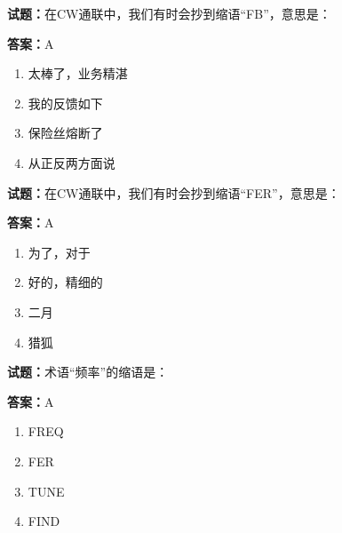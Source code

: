 \documentclass{ctexbook}
\begin{document}




\vspace{1em}

\textbf{试题：}在CW通联中，我们有时会抄到缩语“FB”，意思是： 

\textbf{答案：}A 

\begin{enumerate}[leftmargin=3em]
  \item 太棒了，业务精湛 

  \item 我的反馈如下 

  \item 保险丝熔断了 

  \item 从正反两方面说 

\end{enumerate}





\vspace{1em}

\textbf{试题：}在CW通联中，我们有时会抄到缩语“FER”，意思是： 

\textbf{答案：}A 

\begin{enumerate}[leftmargin=3em]
  \item 为了，对于 

  \item 好的，精细的 

  \item 二月 

  \item 猎狐 

\end{enumerate}





\vspace{1em}

\textbf{试题：}术语“频率”的缩语是： 

\textbf{答案：}A 

\begin{enumerate}[leftmargin=3em]
  \item FREQ 

  \item FER 

  \item TUNE 

  \item FIND 

\end{enumerate}
\end{document}
